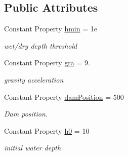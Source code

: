 \subsection*{Public Attributes}
\begin{DoxyCompactItemize}
\item 
Constant Property \hyperlink{class_dam_break_dry_uniform_mesh2d_a7ef9c6843f93563aa74b7a71b3fa6331}{hmin} = 1e
\begin{DoxyCompactList}\small\item\em wet/dry depth threshold \end{DoxyCompactList}\item 
Constant Property \hyperlink{class_dam_break_dry_uniform_mesh2d_afc32f501fb5937dda0188117888a3906}{gra} = 9.
\begin{DoxyCompactList}\small\item\em gravity acceleration \end{DoxyCompactList}\item 
Constant Property \hyperlink{class_dam_break_dry_uniform_mesh2d_aab893f11b4e6ac6169e316c81a2a41e2}{dam\+Position} = 500
\begin{DoxyCompactList}\small\item\em Dam position. \end{DoxyCompactList}\item 
Constant Property \hyperlink{class_dam_break_dry_uniform_mesh2d_adf157114c449b591654c7eb292f9ae0f}{h0} = 10
\begin{DoxyCompactList}\small\item\em initial water depth \end{DoxyCompactList}\end{DoxyCompactItemize}
